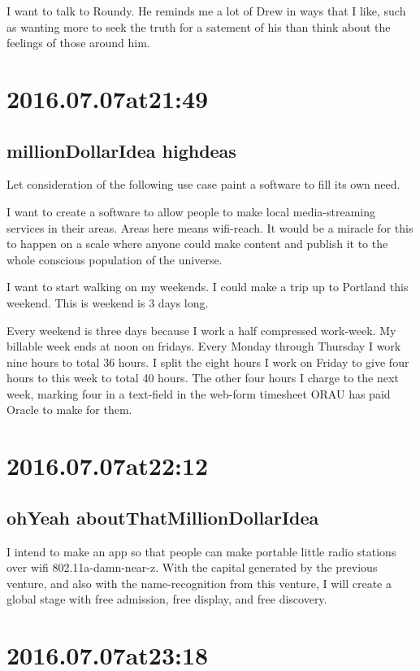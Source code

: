 I want to talk to Roundy. He reminds me a lot of Drew in ways that I like, such as wanting more to seek the truth for a satement of his than think about the feelings of those around him.

\section*{ 2016.07.07at21:49 }
\subsection*{ millionDollarIdea highdeas }
Let consideration of the following use case paint a software to fill its own need.

I want to create a software to allow people to make local media-streaming services in their areas. Areas here means wifi-reach. It would be a miracle for this to happen on a scale where anyone could make content and publish it to the whole conscious population of the universe.\

I want to start walking on my weekends. I could make a trip up to Portland this weekend. This is weekend is 3 days long.

Every weekend is three days because I work a half compressed work-week. My billable week ends at noon on fridays. Every Monday through Thursday I work nine hours to total 36 hours. I split the eight hours I work on Friday to give four hours to this week to total 40 hours. The other four hours I charge to the next week, marking four in a text-field in the web-form timesheet ORAU has paid Oracle to make for them.



\section*{ 2016.07.07at22:12 }
\subsection*{ ohYeah aboutThatMillionDollarIdea }
I intend to make an app so that people can make portable little radio stations over wifi 802.11a-damn-near-z. With the capital generated by the previous venture, and also with the name-recognition from this venture, I will create a global stage with free admission, free display, and free discovery.

\section*{ 2016.07.07at23:18 }
